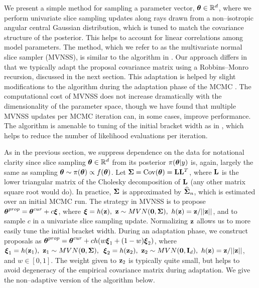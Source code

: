 We present a simple method for sampling a parameter vector, $ \boldsymbol{\theta}\in\mathbb{R}^d $, where we perform univariate slice sampling updates along rays drawn from a non--isotropic angular central Gaussian distribution, which is tuned to match the covariance structure of the posterior. This helps to account for linear correlations among model parameters. The method, which we refer to as the multivariate normal slice sampler (MVNSS), is similar to the algorithm in \cite{ahmadian2011efficient}. Our approach differs in that we typically adapt the proposal covariance matrix using a Robbins--Monro recursion, discussed in the next section. This adaptation is helped by slight modifications to the algorithm during the adaptation phase of the MCMC \cite{andrieu2008tutorial,liang2011advanced}. The computational cost of MVNSS does not increase dramatically with the dimensionality of the parameter space, though we have found that multiple MVNSS updates per MCMC iteration can, in some cases, improve performance. The algorithm is amenable to tuning of the initial bracket width as in \cite{tibbits2014automated}, which helps to reduce the number of likelihood evaluations per iteration.

As in the previous section, we suppress dependence on the data for notational clarity since slice sampling $ \boldsymbol{\theta}\in\mathbb{R}^d $ from its posterior $ \pi(\boldsymbol{\theta}|y) $ is, again, largely the same as sampling $ \boldsymbol{\theta} \sim \pi(\boldsymbol{\theta})\propto f(\boldsymbol{\theta})$. Let $ \boldsymbol{\Sigma} = \mathrm{Cov}(\boldsymbol{\theta}) = \mathbf{L}\mathbf{L}^T $, where $ \mathbf{L} $ is the lower triangular matrix of the Cholesky decomposition of $ \mathbf{L} $ (any other matrix square root would do). In practice, $ \boldsymbol{\Sigma} $ is approximated by $ \widehat{\boldsymbol{\Sigma}}_n $, which is estimated over an initial MCMC run. The strategy in MVNSS is to propose $ \boldsymbol{\theta}^{prop} = \boldsymbol{\theta}^{cur} + c\boldsymbol{\xi} $, where $ \boldsymbol{\xi} = h(\mathbf{z}),\ \mathbf{z}\sim MVN(\mathbf{0},\boldsymbol{\Sigma}),\ h(\mathbf{z}) = \mathbf{z} / ||\mathbf{z}|| $, and to sample $ c $ in a univariate slice sampling update. Normalizing $ \mathbf{z} $ allows us to more easily tune the initial bracket width. During an adaptation phase, we construct proposals as $ \boldsymbol{\theta}^{prop} = \boldsymbol{\theta}^{cur} + ch(w\boldsymbol{\xi}_1 + (1-w)\boldsymbol{\xi}_2) $, where $ \boldsymbol{\xi}_1 = h(\mathbf{z}_1),\ \mathbf{z}_1\sim MVN(\mathbf{0},\boldsymbol{\Sigma}),\,\ \boldsymbol{\xi}_2 = h(\mathbf{z}_2),\ \mathbf{z}_2\sim MVN(\mathbf{0}, \mathbf{I}_d), \ h(\mathbf{z}) = \mathbf{z} / ||\mathbf{z}|| $, and $ w\in[0,1] $. The weight given to $ \mathbf{z}_2 $ is typically quite small, but helps to avoid degeneracy of the empirical covariance matrix during adaptation. We give the non--adaptive version of the algorithm below. 

